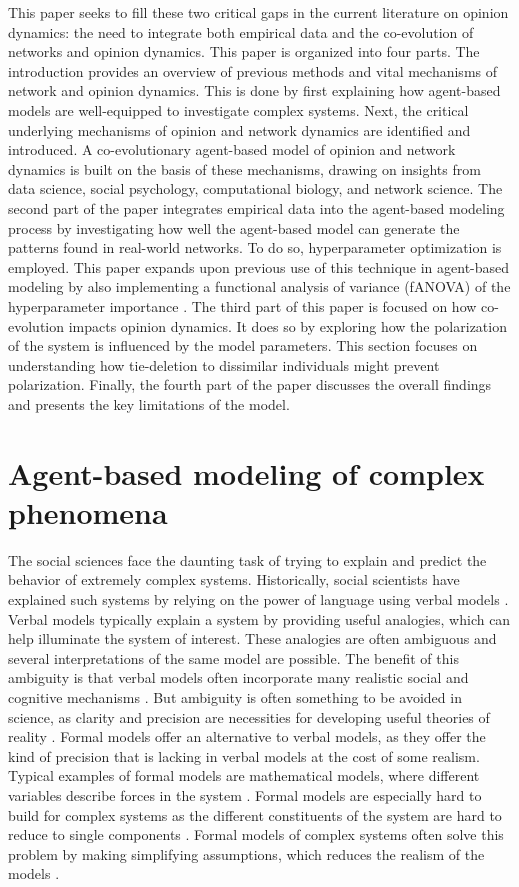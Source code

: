 \documentclass[11pt]{article}
\begin{document}
\noindent This paper seeks to fill these two critical gaps in the current literature on opinion dynamics: the need to integrate both empirical data and the co-evolution of networks and opinion dynamics. This paper is organized into four parts. The introduction provides an overview of previous methods and vital mechanisms of network and opinion dynamics. This is done by first explaining how agent-based models are well-equipped to investigate complex systems. Next, the critical underlying mechanisms of opinion and network dynamics are identified and introduced. A co-evolutionary agent-based model of opinion and network dynamics is built on the basis of these mechanisms, drawing on insights from data science, social psychology, computational biology, and network science. 
The second part of the paper integrates empirical data into the agent-based modeling process by investigating how well the agent-based model can generate the patterns found in real-world networks. To do so, hyperparameter optimization is employed. This paper expands upon previous use of this technique in agent-based modeling by also implementing a functional analysis of variance (fANOVA) of the hyperparameter importance \cite{hutter2014efficient}. 
The third part of this paper is focused on how co-evolution impacts opinion dynamics. It does so by exploring how the polarization of the system is influenced by the model parameters. This section focuses on understanding how tie-deletion to dissimilar individuals might prevent polarization. 
Finally, the fourth part of the paper discusses the overall findings and presents the key limitations of the model. 

\section{Agent-based modeling of complex phenomena}
The social sciences face the daunting task of trying to explain and predict the behavior of extremely complex systems. 
Historically, social scientists have explained such systems by relying on the power of language using verbal models \cite{smaldino_how_2020}. Verbal models typically explain a system by providing useful analogies, which can help illuminate the system of interest. These analogies are often ambiguous and several interpretations of the same model are possible. The benefit of this ambiguity is that verbal models often incorporate many realistic social and cognitive mechanisms \cite{fogarty_ten_2022}. But ambiguity is often something to be avoided in science, as clarity and precision are necessities for developing useful theories of reality \cite{smaldino_how_2020}. 
Formal models offer an alternative to verbal models, as they offer the kind of precision that is lacking in verbal models at the cost of some realism. Typical examples of formal models are mathematical models, where different variables describe forces in the system \cite{fogarty_ten_2022}. Formal models are especially hard to build for complex systems as the different constituents of the system are hard to reduce to single components \cite{smaldino_how_2020, poli2013note}. Formal models of complex systems often solve this problem by making simplifying assumptions, which reduces the realism of the models \cite{fogarty_ten_2022}. 
\end{document}
